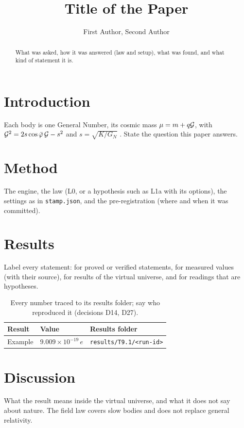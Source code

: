 \documentclass[draft]{coexist}
\title{Title of the Paper}
\author{First Author\affil{1}, Second Author\affil{1,2}}
\affiliation{2}{Other institution (optional)}   %
\begin{document}
\maketitle

\begin{abstract}
What was asked, how it was answered (law and setup), what was found, and what kind of statement it is.
\end{abstract}

\section{Introduction}
Each body is one General Number, its cosmic mass $\mu = m + q\mathcal{G}$, with
$\mathcal{G}^2 = 2s\cos\bar\varphi\,\mathcal{G} - s^2$ and $s = \sqrt{K/G_N}$ \citep{derraz-gn,derraz-cm}.
State the question this paper answers.

\section{Method}
The engine, the law (L0, or a hypothesis such as L1a with its options), the settings as in
\texttt{stamp.json}, and the pre-registration (where and when it was committed).

\section{Results}
Label every statement:
\mathematics{} for proved or verified statements,
 for measured values (with their source),
 for results of the virtual universe, and  for readings that are hypotheses.

\begin{table}[h]\centering\small
\begin{tabular}{lll}\toprule
Result & Value & Results folder \\\midrule
Example & $9.009\times10^{-19}\,e$ & \texttt{results/T9.1/<run-id>} \\\bottomrule
\end{tabular}
\caption{Every number traced to its results folder; say who reproduced it (decisions D14, D27).}
\end{table}

\section{Discussion}
What the result means inside the virtual universe, and what it does not say about nature.
The field law covers slow bodies and does not replace general relativity.
\end{document}
